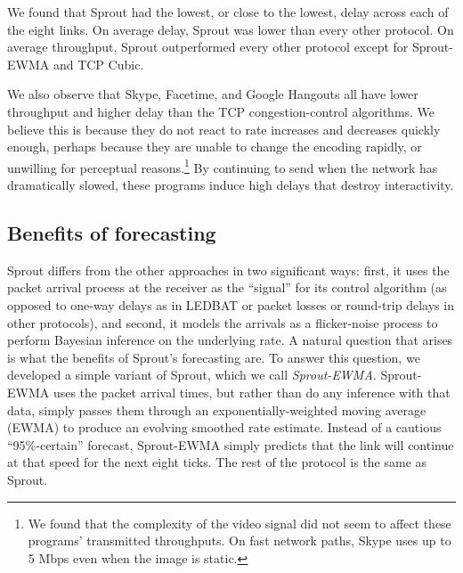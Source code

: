 We found that Sprout had the lowest, or close to the lowest, delay
across each of the eight links. On average delay, Sprout was lower
than every other protocol. On average throughput, Sprout outperformed
every other protocol except for Sprout-EWMA and TCP Cubic.

We also observe that Skype, Facetime, and Google Hangouts all have
lower throughput and higher delay than the TCP congestion-control
algorithms. We believe this is because they do not react to rate
increases and decreases quickly enough, perhaps because they are
unable to change the encoding rapidly, or unwilling for perceptual
reasons.\footnote{We found that the complexity of the video signal did
  not seem to affect these programs' transmitted throughputs. On fast
  network paths, Skype uses up to 5 Mbps even when the image is
  static.} By continuing to send when the network has dramatically
slowed, these programs induce high delays that destroy interactivity.

\subsection{Benefits of forecasting}

Sprout differs from the other approaches in two significant ways:
first, it uses the packet arrival process at the receiver as the
``signal'' for its control algorithm (as opposed to one-way delays as
in LEDBAT or packet losses or round-trip delays in other protocols),
and second, it models the arrivals as a flicker-noise process to
perform Bayesian inference on the underlying rate. A natural question
that arises is what the benefits of Sprout's forecasting are. To
answer this question, we developed a simple variant of Sprout, which
we call {\em Sprout-EWMA}. Sprout-EWMA uses the packet arrival times,
but rather than do any inference with that data, simply passes them
through an exponentially-weighted moving average (EWMA) to produce an
evolving smoothed rate estimate. Instead of a cautious
``95\%-certain'' forecast, Sprout-EWMA simply predicts that the link will
continue at that speed for the next eight ticks. The rest of the
protocol is the same as Sprout.

